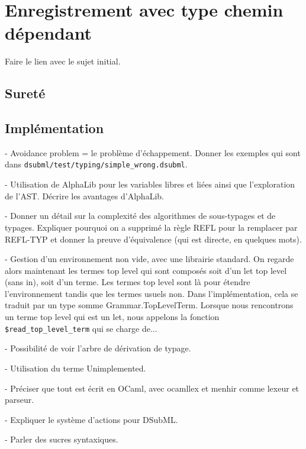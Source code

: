 \chapter{Enregistrement avec type chemin dépendant}

Faire le lien avec le sujet initial.

\section{Sureté}

\section{Implémentation}

- Avoidance problem = le problème d'échappement. Donner les exemples qui sont
dans \verb|dsubml/test/typing/simple_wrong.dsubml|.

- Utilisation de AlphaLib pour les variables libres et liées ainsi que
l'exploration de l'AST. Décrire les avantages d'AlphaLib.

- Donner un détail sur la complexité des algorithmes de sous-typages et de
typages. Expliquer pourquoi on a supprimé la règle REFL pour la remplacer par
REFL-TYP et donner la preuve d'équivalence (qui est directe, en quelques mots).

- Gestion d'un environnement non vide, avec une librairie standard. On regarde
alors maintenant les termes top level qui sont composés soit d'un let top level
(sans in), soit d'un terme. Les termes top level sont là pour étendre
l'environnement tandis que les termes usuels non. Dans l'implémentation, cela se
traduit par un type somme Grammar.TopLevelTerm. Lorsque nous rencontrons un
terme top level qui est un let, nous appelons la fonction \verb|$read_top_level_term|
qui se charge de...

- Possibilité de voir l'arbre de dérivation de typage.

- Utilisation du terme Unimplemented.

- Préciser que tout est écrit en OCaml, avec ocamllex et menhir comme lexeur et parseur.

- Expliquer le système d'actions pour DSubML.

- Parler des sucres syntaxiques.